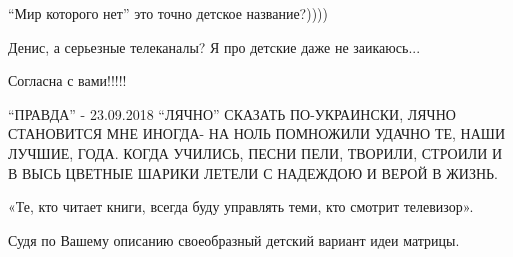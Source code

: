 \begin{itemize} %
\enquote{Мир которого нет} это точно детское название?))))

Денис, а серьезные телеканалы? Я про детские даже не заикаюсь...

Согласна с вами!!!!!


\obeycr
\enquote{ПРАВДА} - 23.09.2018
\enquote{ЛЯЧНО}
СКАЗАТЬ ПО-УКРАИНСКИ, ЛЯЧНО
СТАНОВИТСЯ МНЕ ИНОГДА-
НА НОЛЬ ПОМНОЖИЛИ УДАЧНО
ТЕ, НАШИ ЛУЧШИЕ, ГОДА.
КОГДА УЧИЛИСЬ, ПЕСНИ ПЕЛИ,
ТВОРИЛИ, СТРОИЛИ И В ВЫСЬ
ЦВЕТНЫЕ ШАРИКИ ЛЕТЕЛИ
С НАДЕЖДОЮ И ВЕРОЙ В ЖИЗНЬ.
\restorecr

«Те, кто читает книги, всегда буду управлять теми, кто смотрит телевизор».

Судя по Вашему описанию своеобразный детский вариант идеи матрицы.
\end{itemize} %
